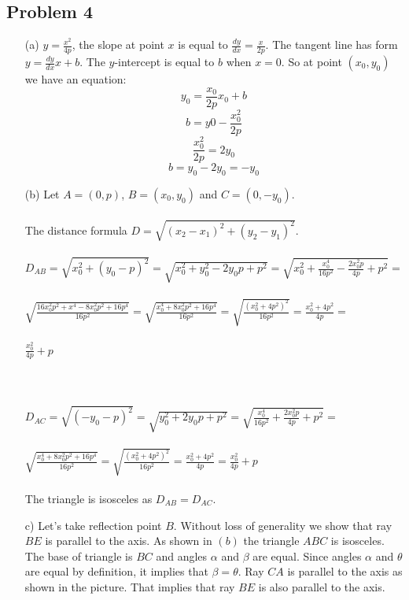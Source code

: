 \documentclass{article}
\begin{document}
\subsection{Problem 4}
\begin{itemize}
 \item[(a)] $y = \frac{x^2}{4p}$, the slope at point $x$ is equal to $\frac{dy}{dx} = \frac{x}{2p}$.
 The tangent line has form $y = \frac{dy}{dx}x + b$. The $y$-intercept is equal to $b$ when $x = 0$. So at point $(x_0, y_0)$ we have an equation:
 \[ y_0 = \frac{x_0}{2p}x_0 + b \]
 \[ b = y0 - \frac{x_0^2}{2p} \]
 \[ \frac{x_0^2}{2p} = 2y_0 \]
 \[ b = y_0 - 2y_0 = -y_0 \]

\item[(b)] Let $A = (0,p)$, $B = (x_0, y_0)$ and $C = (0, -y_0)$.\\
\\
The distance formula $D = \sqrt{(x_2 - x_1)^2 + (y_2 - y_1)^2}$. 
\\ \\
$D_{AB} = \sqrt{x_0^2 + (y_0-p)^2} = \sqrt{x_0^2 + y_0^2 - 2y_0p + p^2} = \sqrt{x_0^2+\frac{x_0^4}{16p^2}-\frac{2x_0^2p}{4p}+p^2} =$ \\ \\ $\sqrt{\frac{16x_0^2p^2+x^4-8x_0^2p^2+16p^4}{16p^2}} = \sqrt{\frac{x_0^4+8x_0^2p^2+16p^4}{16p^2}} = \sqrt{\frac{(x_0^2+4p^2)^2} {16p^2}}=\frac{x_0^2+4p^2}{4p} = $ \\ \\ $\frac{x_0^2}{4p}+p$ \\ \\ \\ \\
$D_{AC} = \sqrt{(-y_0-p)^2} = \sqrt{y_0^2 + 2y_0p + p^2} = \sqrt{\frac{x_0^4}{16p^2} + \frac{2x_0^2p}{4p} + p^2} = $
\\ \\
$\sqrt{\frac{x_0^4+8x_0^2p^2+16p^4}{16p^2}} = \sqrt{\frac{(x_0^2+4p^2)^2}{16p^2}} = \frac{x_0^2+4p^2}{4p} = \frac{x_0^2}{4p} + p$ \\ \\

The triangle is isosceles as $D_{AB} = D_{AC}$.
\item[c)]
Let's take reflection point $B$. Without loss of generality we show that ray $BE$ is parallel to the axis. As shown in $(b)$ the triangle $ABC$ is isosceles. The base of triangle is $BC$ and angles $\alpha$ and $\beta$ are equal. Since angles $\alpha$ and $\theta$ are equal by definition, it implies that $\beta = \theta$. Ray $CA$ is parallel to the axis as shown in the picture. That implies that ray $BE$ is also parallel to the axis. 
\begin{figure}[htp!]
    \centering
    
    \label{fig:fig3}
\end{figure}
\end{itemize}
\end{document}
